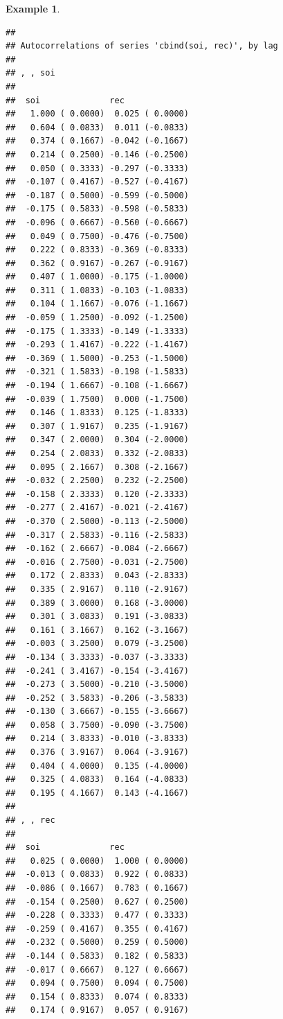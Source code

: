 \documentclass[
]{book}
\theoremstyle{definition}
\theoremstyle{definition}
\newtheorem{example}{Example}[chapter]
\theoremstyle{definition}
\theoremstyle{definition}
\theoremstyle{remark}
\begin{document}
\begin{example}
\begin{verbatim}
## 
## Autocorrelations of series 'cbind(soi, rec)', by lag
## 
## , , soi
## 
##  soi              rec             
##   1.000 ( 0.0000)  0.025 ( 0.0000)
##   0.604 ( 0.0833)  0.011 (-0.0833)
##   0.374 ( 0.1667) -0.042 (-0.1667)
##   0.214 ( 0.2500) -0.146 (-0.2500)
##   0.050 ( 0.3333) -0.297 (-0.3333)
##  -0.107 ( 0.4167) -0.527 (-0.4167)
##  -0.187 ( 0.5000) -0.599 (-0.5000)
##  -0.175 ( 0.5833) -0.598 (-0.5833)
##  -0.096 ( 0.6667) -0.560 (-0.6667)
##   0.049 ( 0.7500) -0.476 (-0.7500)
##   0.222 ( 0.8333) -0.369 (-0.8333)
##   0.362 ( 0.9167) -0.267 (-0.9167)
##   0.407 ( 1.0000) -0.175 (-1.0000)
##   0.311 ( 1.0833) -0.103 (-1.0833)
##   0.104 ( 1.1667) -0.076 (-1.1667)
##  -0.059 ( 1.2500) -0.092 (-1.2500)
##  -0.175 ( 1.3333) -0.149 (-1.3333)
##  -0.293 ( 1.4167) -0.222 (-1.4167)
##  -0.369 ( 1.5000) -0.253 (-1.5000)
##  -0.321 ( 1.5833) -0.198 (-1.5833)
##  -0.194 ( 1.6667) -0.108 (-1.6667)
##  -0.039 ( 1.7500)  0.000 (-1.7500)
##   0.146 ( 1.8333)  0.125 (-1.8333)
##   0.307 ( 1.9167)  0.235 (-1.9167)
##   0.347 ( 2.0000)  0.304 (-2.0000)
##   0.254 ( 2.0833)  0.332 (-2.0833)
##   0.095 ( 2.1667)  0.308 (-2.1667)
##  -0.032 ( 2.2500)  0.232 (-2.2500)
##  -0.158 ( 2.3333)  0.120 (-2.3333)
##  -0.277 ( 2.4167) -0.021 (-2.4167)
##  -0.370 ( 2.5000) -0.113 (-2.5000)
##  -0.317 ( 2.5833) -0.116 (-2.5833)
##  -0.162 ( 2.6667) -0.084 (-2.6667)
##  -0.016 ( 2.7500) -0.031 (-2.7500)
##   0.172 ( 2.8333)  0.043 (-2.8333)
##   0.335 ( 2.9167)  0.110 (-2.9167)
##   0.389 ( 3.0000)  0.168 (-3.0000)
##   0.301 ( 3.0833)  0.191 (-3.0833)
##   0.161 ( 3.1667)  0.162 (-3.1667)
##  -0.003 ( 3.2500)  0.079 (-3.2500)
##  -0.134 ( 3.3333) -0.037 (-3.3333)
##  -0.241 ( 3.4167) -0.154 (-3.4167)
##  -0.273 ( 3.5000) -0.210 (-3.5000)
##  -0.252 ( 3.5833) -0.206 (-3.5833)
##  -0.130 ( 3.6667) -0.155 (-3.6667)
##   0.058 ( 3.7500) -0.090 (-3.7500)
##   0.214 ( 3.8333) -0.010 (-3.8333)
##   0.376 ( 3.9167)  0.064 (-3.9167)
##   0.404 ( 4.0000)  0.135 (-4.0000)
##   0.325 ( 4.0833)  0.164 (-4.0833)
##   0.195 ( 4.1667)  0.143 (-4.1667)
## 
## , , rec
## 
##  soi              rec             
##   0.025 ( 0.0000)  1.000 ( 0.0000)
##  -0.013 ( 0.0833)  0.922 ( 0.0833)
##  -0.086 ( 0.1667)  0.783 ( 0.1667)
##  -0.154 ( 0.2500)  0.627 ( 0.2500)
##  -0.228 ( 0.3333)  0.477 ( 0.3333)
##  -0.259 ( 0.4167)  0.355 ( 0.4167)
##  -0.232 ( 0.5000)  0.259 ( 0.5000)
##  -0.144 ( 0.5833)  0.182 ( 0.5833)
##  -0.017 ( 0.6667)  0.127 ( 0.6667)
##   0.094 ( 0.7500)  0.094 ( 0.7500)
##   0.154 ( 0.8333)  0.074 ( 0.8333)
##   0.174 ( 0.9167)  0.057 ( 0.9167)

\end{verbatim}
\end{example}
\end{document}
